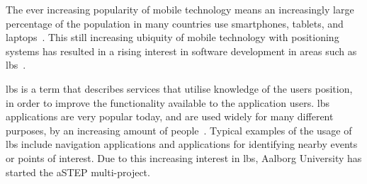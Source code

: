 The ever increasing popularity of mobile technology means an increasingly large percentage of the population in many countries use smartphones, tablets, and laptops~\cite{techcrunch_mobile_usage}. This still increasing ubiquity of mobile technology with positioning systems has resulted in a rising interest in software development in areas such as \gls{lbs}~\cite{dey2010location}. 

\gls{lbs} is a term that describes services that utilise knowledge of the users position, in order to improve the functionality available to the application users. \gls{lbs} applications are very popular today, and are used widely for many different purposes, by an increasing amount of people~\cite[1-2]{schiller2004location}. Typical examples of the usage of \gls{lbs} include navigation applications and applications for identifying nearby events or points of interest. Due to this increasing interest in \gls{lbs}, Aalborg University has started the aSTEP multi-project. 

